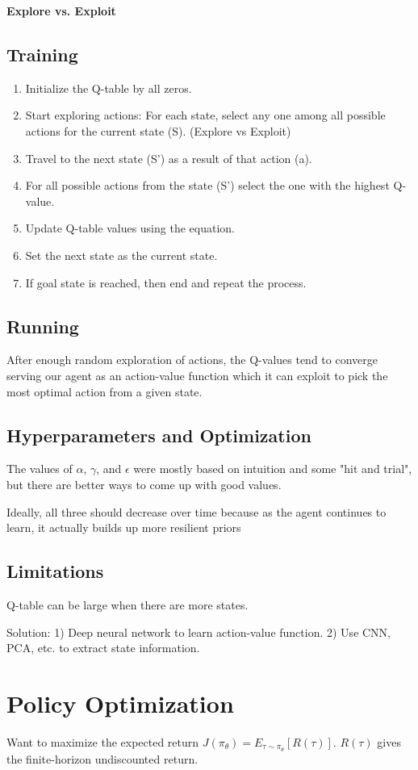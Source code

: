 \documentclass{article}
\begin{document}
\textbf{Explore vs. Exploit}

\subsection{Training}
  \begin{enumerate}
    \item Initialize the Q-table by all zeros.
    \item Start exploring actions: For each state, select any one among all possible actions for the current state (S). (Explore vs Exploit)
    \item Travel to the next state (S') as a result of that action (a).
    \item For all possible actions from the state (S') select the one with the highest Q-value.
    \item Update Q-table values using the equation.
    \item Set the next state as the current state.
    \item If goal state is reached, then end and repeat the process.
  \end{enumerate}
\subsection{Running}
  After enough random exploration of actions, the Q-values tend to converge serving our agent as an action-value function which it can exploit to pick the most optimal action from a given state.
\subsection{Hyperparameters and Optimization}
  The values of $\alpha$, $\gamma$, and $\epsilon$ were mostly based on intuition and some "hit and trial", but there are better ways to come up with good values.

  Ideally, all three should decrease over time because as the agent continues to learn, it actually builds up more resilient priors
\subsection{Limitations}
    Q-table can be large when there are more states. 
    
    Solution: 1) Deep neural network to learn action-value function. 2) Use CNN, PCA, etc. to extract state information. 
\section{Policy Optimization}
    Want to maximize the expected return $J(\pi_{\theta}) = E_{\tau \sim \pi_{\theta}}[R(\tau)]$. $R(\tau)$ gives the finite-horizon undiscounted return.
    
\end{document}
